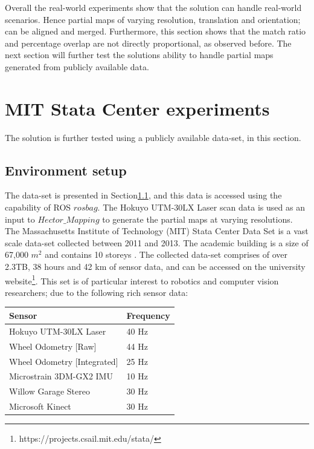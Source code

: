 Overall the real-world experiments show that the solution can handle real-world scenarios. Hence partial maps of varying resolution, translation and orientation; can be aligned and merged. Furthermore, this section shows that the match ratio and percentage overlap are not directly proportional, as observed before. The next section will further test the solutions ability to handle partial maps generated from publicly available data.


\section{MIT Stata Center experiments}
\label{sec:ch4.section2}

The solution is further tested using a publicly available data-set, in this section. 

\subsection{Environment setup}
\label{sec:ch4.subsecMIT}

The data-set is presented in Section\ref{sec:ch4.subsecMIT}, and this data is accessed using the capability of ROS \(rosbag\). The Hokuyo UTM-30LX Laser scan data is used as an input to \(Hector\_Mapping\) to generate the partial maps at varying resolutions.
The Massachusetts Institute of Technology (MIT) Stata Center Data Set is a vast scale data-set collected between 2011 and 2013. The academic building is a size of 67,000 $m^2$ and contains 10 storeys \cite{doi:10.1177/0278364913509035}. The collected data-set comprises of over 2.3TB, 38 hours and 42 km of sensor data, and can be accessed on the university website\footnote{https://projects.csail.mit.edu/stata/}. This set is of particular interest to robotics and computer vision researchers; due to the following rich sensor data:

\begin{center}
\begin{tabular}{ | m{5cm} | m{2cm}| } 
\hline
Sensor & Frequency \\ 
\hline
\hline
 Hokuyo UTM-30LX Laser  & 40 Hz\\ 
\hline
Wheel Odometry [Raw] & 44 Hz \\ 
\hline
Wheel Odometry [Integrated] & 25 Hz \\ 
\hline
Microstrain 3DM-GX2 IMU	& 10 Hz \\
\hline
Willow Garage Stereo & 30 Hz \\
\hline
Microsoft Kinect & 30 Hz \\
\hline
\end{tabular}
\end{center}

